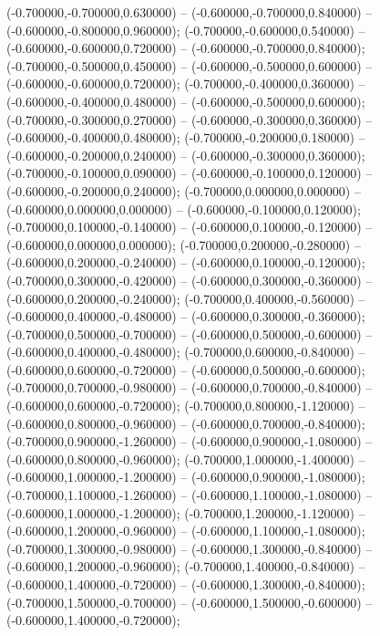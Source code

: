  (-0.700000,-0.700000,0.630000) -- (-0.600000,-0.700000,0.840000) -- (-0.600000,-0.800000,0.960000);
 (-0.700000,-0.600000,0.540000) -- (-0.600000,-0.600000,0.720000) -- (-0.600000,-0.700000,0.840000);
 (-0.700000,-0.500000,0.450000) -- (-0.600000,-0.500000,0.600000) -- (-0.600000,-0.600000,0.720000);
 (-0.700000,-0.400000,0.360000) -- (-0.600000,-0.400000,0.480000) -- (-0.600000,-0.500000,0.600000);
 (-0.700000,-0.300000,0.270000) -- (-0.600000,-0.300000,0.360000) -- (-0.600000,-0.400000,0.480000);
 (-0.700000,-0.200000,0.180000) -- (-0.600000,-0.200000,0.240000) -- (-0.600000,-0.300000,0.360000);
 (-0.700000,-0.100000,0.090000) -- (-0.600000,-0.100000,0.120000) -- (-0.600000,-0.200000,0.240000);
 (-0.700000,0.000000,0.000000) -- (-0.600000,0.000000,0.000000) -- (-0.600000,-0.100000,0.120000);
 (-0.700000,0.100000,-0.140000) -- (-0.600000,0.100000,-0.120000) -- (-0.600000,0.000000,0.000000);
 (-0.700000,0.200000,-0.280000) -- (-0.600000,0.200000,-0.240000) -- (-0.600000,0.100000,-0.120000);
 (-0.700000,0.300000,-0.420000) -- (-0.600000,0.300000,-0.360000) -- (-0.600000,0.200000,-0.240000);
 (-0.700000,0.400000,-0.560000) -- (-0.600000,0.400000,-0.480000) -- (-0.600000,0.300000,-0.360000);
 (-0.700000,0.500000,-0.700000) -- (-0.600000,0.500000,-0.600000) -- (-0.600000,0.400000,-0.480000);
 (-0.700000,0.600000,-0.840000) -- (-0.600000,0.600000,-0.720000) -- (-0.600000,0.500000,-0.600000);
 (-0.700000,0.700000,-0.980000) -- (-0.600000,0.700000,-0.840000) -- (-0.600000,0.600000,-0.720000);
 (-0.700000,0.800000,-1.120000) -- (-0.600000,0.800000,-0.960000) -- (-0.600000,0.700000,-0.840000);
 (-0.700000,0.900000,-1.260000) -- (-0.600000,0.900000,-1.080000) -- (-0.600000,0.800000,-0.960000);
 (-0.700000,1.000000,-1.400000) -- (-0.600000,1.000000,-1.200000) -- (-0.600000,0.900000,-1.080000);
 (-0.700000,1.100000,-1.260000) -- (-0.600000,1.100000,-1.080000) -- (-0.600000,1.000000,-1.200000);
 (-0.700000,1.200000,-1.120000) -- (-0.600000,1.200000,-0.960000) -- (-0.600000,1.100000,-1.080000);
 (-0.700000,1.300000,-0.980000) -- (-0.600000,1.300000,-0.840000) -- (-0.600000,1.200000,-0.960000);
 (-0.700000,1.400000,-0.840000) -- (-0.600000,1.400000,-0.720000) -- (-0.600000,1.300000,-0.840000);
 (-0.700000,1.500000,-0.700000) -- (-0.600000,1.500000,-0.600000) -- (-0.600000,1.400000,-0.720000);
